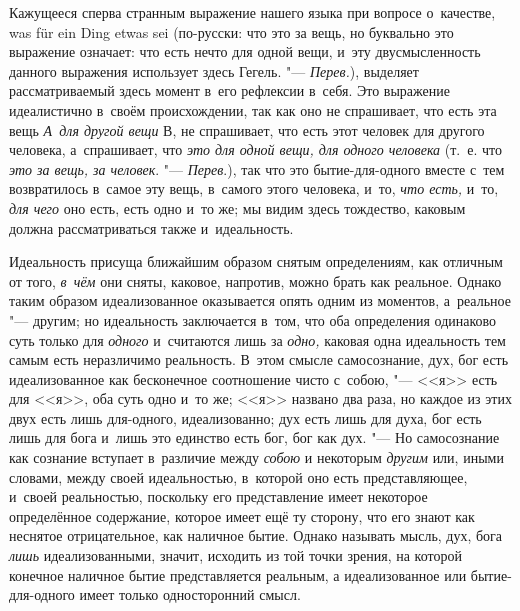 Кажущееся сперва странным выражение нашего языка при вопросе о~качестве, was
für ein Ding etwas sei (по-русски: что это за вещь, но буквально это
выражение означает: что есть нечто для одной вещи, и~эту двусмысленность
данного выражения использует здесь Гегель. "--- {\em Перев.}), выделяет
рассматриваемый здесь момент в~его рефлексии в~себя. Это выражение
идеалистично в~своём происхождении, так как оно не спрашивает, что есть эта
вещь {\em А~для другой вещи} В, не спрашивает, что есть
этот человек для другого человека, а~спрашивает, что
{\em это для одной вещи, для одного человека} (т.~е.
что {\em это за вещь, за человек}. "--- {\em Перев}.),
так что это бытие-для-одного вместе с~тем
возвратилось в~самое эту вещь, в~самого этого человека, и~то,
{\em что есть,} и~то, {\em для чего} оно есть,
есть одно и~то же; мы видим здесь тождество, каковым должна
рассматриваться также и~идеальность.

Идеальность присуща ближайшим образом снятым определениям, как отличным от
того, {\em в~чём} они сняты, каковое, напротив, можно
брать как реальное. Однако таким образом идеализованное оказывается опять
одним из моментов, а~реальное "--- другим; но идеальность заключается в~том,
что оба определения одинаково суть только для
{\em одного} и~считаются лишь за
{\em одно,} каковая одна идеальность тем самым есть
неразличимо реальность. В~этом смысле самосознание, дух, бог есть
идеализованное как бесконечное соотношение чисто с~собою, "--- <<я>> есть для
<<я>>, оба суть одно и~то же; <<я>> названо два раза, но каждое из этих двух
есть лишь для-одного, идеализованно; дух есть лишь для духа, бог есть лишь
для бога и~лишь это единство есть бог, бог как дух. "--- Но самосознание как
сознание вступает в~различие между {\em собою} и
некоторым {\em другим} или, иными словами, между своей
идеальностью, в~которой оно есть представляющее, и~своей реальностью,
поскольку его представление имеет некоторое определённое содержание,
которое имеет ещё ту сторону, что его знают как неснятое отрицательное,
как наличное бытие. Однако называть мысль, дух, бога
{\em лишь} идеализованными, значит, исходить из той
точки зрения, на которой конечное наличное бытие представляется реальным, а
идеализованное или бытие-для-одного имеет только односторонний смысл.

